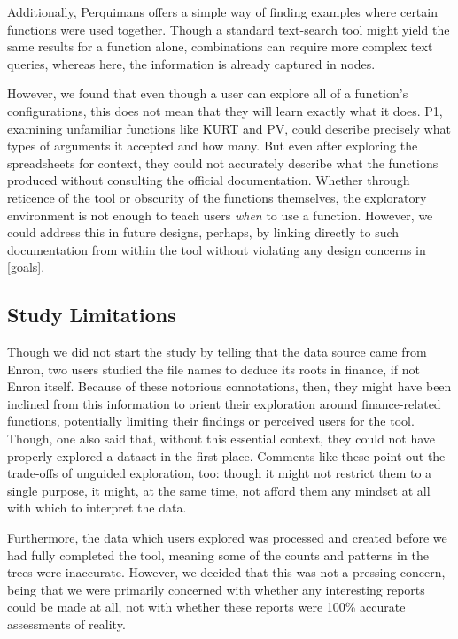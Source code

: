 \documentclass[conference]{IEEEtran}
\newcommand{\toolname}{Perquimans }
\begin{document}
	Additionally, \toolname offers a simple way of finding examples where certain
	functions were used together. Though a standard text-search tool might yield
	the same results for a function alone, combinations can require more complex
	text queries, whereas here, the information is already captured in nodes.  \par
	
	However, we found that even though a user can explore all of a function's
	configurations, this does not mean that they will learn exactly what it does.
	P1, examining unfamiliar functions like KURT and PV, could describe precisely
	what types of arguments it accepted and how many. But even after exploring the
	spreadsheets for context, they could not accurately describe what the functions
	produced without consulting the official documentation. Whether through
	reticence of the tool or obscurity of the functions themselves, the exploratory
	environment is not enough to teach users \textit{when} to use a function.
	However, we could address this in future designs, perhaps, by linking directly
	to such documentation from within the tool without violating any design
	concerns in \ref{goals}. \par
	
	\subsection{Study Limitations} Though we did not start the study by telling
	that the data source came from Enron, two users studied the file names to
	deduce its roots in finance, if not Enron itself. Because of these notorious
	connotations, then, they might have been inclined from this information to
	orient their exploration around finance-related functions, potentially limiting
	their findings or perceived users for the tool. Though, one also said that,
	without this essential context, they could not have properly explored a dataset
	in the first place. Comments like these point out the trade-offs of unguided
	exploration, too: though it might not restrict them to a single purpose, it
	might, at the same time, not afford them any mindset at all with which to
	interpret the data. \par
	
	Furthermore, the data which users explored was processed and created before we
	had fully completed the tool, meaning some of the counts and patterns in the
	trees were inaccurate. However, we decided that this was not a pressing
	concern, being that we were primarily concerned with whether any interesting
	reports could be made at all, not with whether these reports were 100\%
	accurate assessments of reality. \par
	
\end{document}
